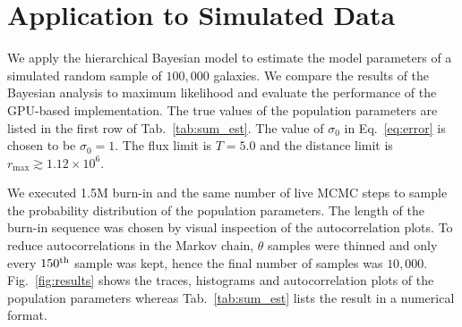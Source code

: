 \section{Application to Simulated Data}
\label{sec:app_on_sim_data}

We apply the hierarchical Bayesian model to estimate the model parameters of a simulated random sample of $100{,}000$ galaxies.
We compare the results of the Bayesian analysis to maximum likelihood and evaluate the performance of the GPU-based implementation.
The true values of the population parameters are listed in the first row of Tab.~\ref{tab:sum_est}.
The value of $\sigma_0$ in Eq.~\ref{eq:error} is chosen to be $\sigma_0=1$.
The flux limit is $T = 5.0$ and the distance limit is $r_{\max} \gtrsim 1.12 \times 10^{6}$.

We executed 1.5M burn-in and the same number of live MCMC steps to sample the probability distribution of the population parameters.
The length of the burn-in sequence was chosen by visual inspection of the autocorrelation plots.
To reduce autocorrelations in the Markov chain, $\theta$ samples were thinned and only every $150^\textnormal{th}$ sample was kept, hence the final number of samples was $10{,}000$.
Fig.~\ref{fig:results} shows the traces, histograms and autocorrelation plots of the population parameters whereas Tab.~\ref{tab:sum_est} lists the result in a numerical format.

